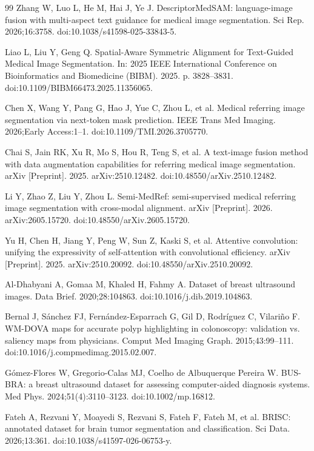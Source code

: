 \begin{thebibliography}{99}
Zhang W, Luo L, He M, Hai J, Ye J. DescriptorMedSAM: language-image fusion with multi-aspect text guidance for medical image segmentation. Sci Rep. 2026;16:3758. doi:10.1038/s41598-025-33843-5.

Liao L, Liu Y, Geng Q. Spatial-Aware Symmetric Alignment for Text-Guided Medical Image Segmentation. In: 2025 IEEE International Conference on Bioinformatics and Biomedicine (BIBM). 2025. p. 3828--3831. doi:10.1109/BIBM66473.2025.11356065.

Chen X, Wang Y, Pang G, Hao J, Yue C, Zhou L, et al. Medical referring image segmentation via next-token mask prediction. IEEE Trans Med Imaging. 2026;Early Access:1--1. doi:10.1109/TMI.2026.3705770.

Chai S, Jain RK, Xu R, Mo S, Hou R, Teng S, et al. A text-image fusion method with data augmentation capabilities for referring medical image segmentation. arXiv [Preprint]. 2025. arXiv:2510.12482. doi:10.48550/arXiv.2510.12482.

Li Y, Zhao Z, Liu Y, Zhou L. Semi-MedRef: semi-supervised medical referring image segmentation with cross-modal alignment. arXiv [Preprint]. 2026. arXiv:2605.15720. doi:10.48550/arXiv.2605.15720.

Yu H, Chen H, Jiang Y, Peng W, Sun Z, Kaski S, et al. Attentive convolution: unifying the expressivity of self-attention with convolutional efficiency. arXiv [Preprint]. 2025. arXiv:2510.20092. doi:10.48550/arXiv.2510.20092.

Al-Dhabyani A, Gomaa M, Khaled H, Fahmy A. Dataset of breast ultrasound images. Data Brief. 2020;28:104863. doi:10.1016/j.dib.2019.104863.

Bernal J, S\'anchez FJ, Fern\'andez-Esparrach G, Gil D, Rodr\'iguez C, Vilari\~no F. WM-DOVA maps for accurate polyp highlighting in colonoscopy: validation vs. saliency maps from physicians. Comput Med Imaging Graph. 2015;43:99--111. doi:10.1016/j.compmedimag.2015.02.007.

G\'omez-Flores W, Gregorio-Calas MJ, Coelho de Albuquerque Pereira W. BUS-BRA: a breast ultrasound dataset for assessing computer-aided diagnosis systems. Med Phys. 2024;51(4):3110--3123. doi:10.1002/mp.16812.

Fateh A, Rezvani Y, Moayedi S, Rezvani S, Fateh F, Fateh M, et al. BRISC: annotated dataset for brain tumor segmentation and classification. Sci Data. 2026;13:361. doi:10.1038/s41597-026-06753-y.


\end{thebibliography}
